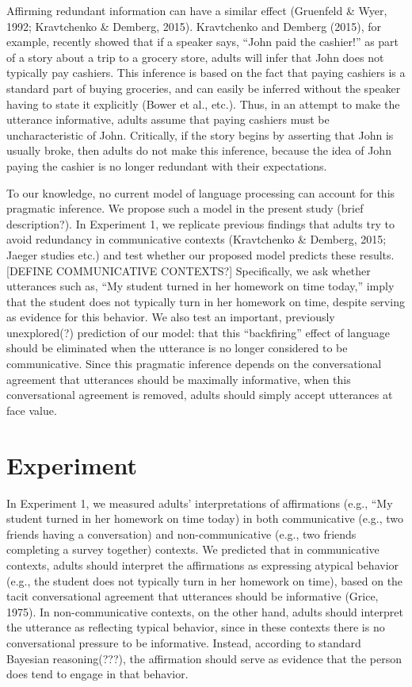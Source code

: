 \documentclass[10pt,letterpaper]{article}
\begin{document}
Affirming redundant information can have a similar effect (Gruenfeld & Wyer, 1992; Kravtchenko & Demberg, 2015).  Kravtchenko and Demberg (2015), for example, recently showed that if a speaker says, “John paid the cashier!” as part of a story about a trip to a grocery store, adults will infer that John does not typically pay cashiers.  This inference is based on the fact that paying cashiers is a standard part of buying groceries, and can easily be inferred without the speaker having to state it explicitly (Bower et al., etc.).  Thus, in an attempt to make the utterance informative, adults assume that paying cashiers must be uncharacteristic of John.  Critically, if the story begins by asserting that John is usually broke, then adults do not make this inference, because the idea of John paying the cashier is no longer redundant with their expectations.

To our knowledge, no current model of language processing can account for this pragmatic inference.  We propose such a model in the present study (brief description?).  In Experiment 1, we replicate previous findings that adults try to avoid redundancy in communicative contexts (Kravtchenko & Demberg, 2015; Jaeger studies etc.) and test whether our proposed model predicts these results.  [DEFINE COMMUNICATIVE CONTEXTS?] Specifically, we ask whether utterances such as, “My student turned in her homework on time today,” imply that the student does not typically turn in her homework on time, despite serving as evidence for this behavior.  We also test an important, previously unexplored(?) prediction of our model: that this “backfiring” effect of language should be eliminated when the utterance is no longer considered to be communicative.  Since this pragmatic inference depends on the conversational agreement that utterances should be maximally informative, when this conversational agreement is removed, adults should simply accept utterances at face value.



\section{Experiment}

	In Experiment 1, we measured adults’ interpretations of affirmations (e.g., “My student turned in her homework on time today) in both communicative (e.g., two friends having a conversation) and non-communicative (e.g., two friends completing a survey together) contexts.  We predicted that in communicative contexts, adults should interpret the affirmations as expressing atypical behavior (e.g., the student does not typically turn in her homework on time), based on the tacit conversational agreement that utterances should be informative (Grice, 1975).  In non-communicative contexts, on the other hand, adults should interpret the utterance as reflecting typical behavior, since in these contexts there is no conversational pressure to be informative.  Instead, according to standard Bayesian reasoning(???), the affirmation should serve as evidence that the person does tend to engage in that behavior.
\end{document}
